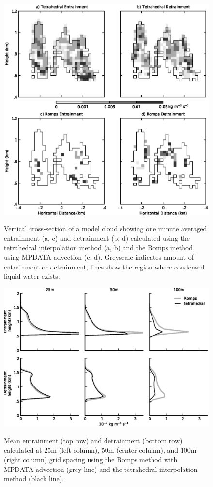 \documentclass[12pt]{article}
\begin{document}
\begin{figure}[t]
  \noindent\includegraphics[width=39pc,angle=0]{./figures/spatial_variability_1min}\\ 
  \caption{Vertical cross-section of a model cloud showing one minute averaged 
  entrainment (a, c) and detrainment (b, d) calculated using the tetrahedral 
  interpolation method (a, b) and the Romps method using MPDATA advection (c, 
  d).  Greyscale indicates amount of entrainment or detrainment, lines show the 
  region where condensed liquid water exists.
  }
  \label{fig:spatial_variability}
\end{figure}

\begin{figure}[t]
  \noindent
  \includegraphics[width=39pc,angle=0]{./figures/resolution_dependence}\\
  \caption{Mean entrainment (top row) and detrainment (bottom row) calculated
  at 25m (left column), 50m (center column), and 100m (right column) grid 
  spacing using the Romps method with MPDATA advection (grey line) and the 
  tetrahedral interpolation method (black line).
  }
  \label{fig:resolution_dependence}
\end{figure}
\end{document}

